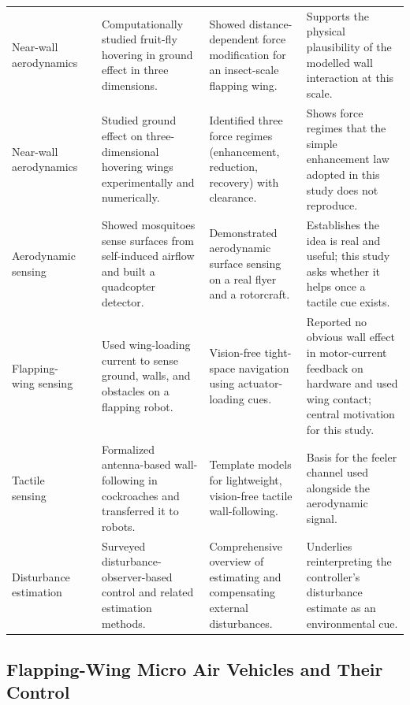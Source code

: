 \documentclass[final,5p,times]{elsarticle}
\begin{document}
\begin{table}[t]
\begin{tabular}{@{}p{2.0cm} p{1.1cm} p{4.4cm} p{4.4cm} p{4.4cm}@{}}
Near-wall aerodynamics &
\cite{maeda2013ground} &
Computationally studied fruit-fly hovering in ground effect in three dimensions. &
Showed distance-dependent force modification for an insect-scale flapping wing. &
Supports the physical plausibility of the modelled wall interaction at this scale. \\

Near-wall aerodynamics &
\cite{lu2016ground} &
Studied ground effect on three-dimensional hovering wings experimentally and numerically. &
Identified three force regimes (enhancement, reduction, recovery) with clearance. &
Shows force regimes that the simple enhancement law adopted in this study does not reproduce. \\

Aerodynamic sensing &
\cite{nakata2020aerodynamic} &
Showed mosquitoes sense surfaces from self-induced airflow and built a quadcopter detector. &
Demonstrated aerodynamic surface sensing on a real flyer and a rotorcraft. &
Establishes the idea is real and useful; this study asks whether it helps once a tactile cue exists. \\

Flapping-wing sensing &
\cite{tu2019acting} &
Used wing-loading current to sense ground, walls, and obstacles on a flapping robot. &
Vision-free tight-space navigation using actuator-loading cues. &
Reported no obvious wall effect in motor-current feedback on hardware and used wing contact; central motivation for this study. \\

Tactile sensing &
\cite{lee2008templates} &
Formalized antenna-based wall-following in cockroaches and transferred it to robots. &
Template models for lightweight, vision-free tactile wall-following. &
Basis for the feeler channel used alongside the aerodynamic signal. \\

Disturbance estimation &
\cite{chen2015disturbance} &
Surveyed disturbance-observer-based control and related estimation methods. &
Comprehensive overview of estimating and compensating external disturbances. &
Underlies reinterpreting the controller's disturbance estimate as an environmental cue. \\

\bottomrule
\end{tabular}
\end{table}

\subsection{Flapping-Wing Micro Air Vehicles and Their Control}
\label{sec:rw_fwmav}
\end{document}
